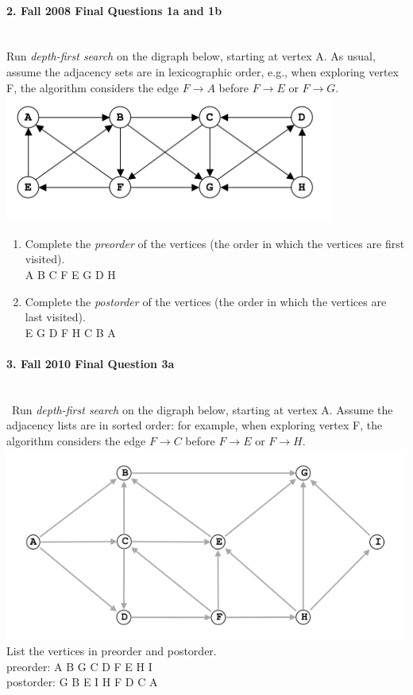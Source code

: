 \documentclass{article}
\begin{document}
\paragraph{\Large 2. Fall 2008 Final Questions 1a and 1b}\mbox{}\\
Run \textit{depth-first search} on the digraph below, starting at vertex A. As usual, assume the adjacency sets are in lexicographic order, e.g., when exploring vertex F, the algorithm considers the edge $F \rightarrow A$ before $F \rightarrow E$ or $F \rightarrow G$.\\
\includegraphics[]{fin-f08-1.png}\\
\begin{enumerate}
\renewcommand{\theenumi}{\Alph{enumi}}
	\item Complete the \textit{preorder} of the vertices (the order in which the vertices are first visited).\\

	A B C F E G D H

	\item Complete the \textit{postorder} of the vertices (the order in which the vertices are last visited).\\

	E G D F H C B A

\end{enumerate}


\paragraph{\Large 3. Fall 2010 Final Question 3a}\mbox{}\\\
Run \textit{depth-first search} on the digraph below, starting at vertex A. Assume the adjacency lists are in sorted order: for example, when exploring vertex F, the algorithm considers the edge $F \rightarrow C$ before $F \rightarrow E$ or $F \rightarrow H$.\\
\includegraphics[]{fin-f10-3a.png}\\
List the vertices in preorder and postorder.\\

	preorder: A B G C D F E H I\\
\indent
	postorder: G B E I H F D C A\\
\end{document}
